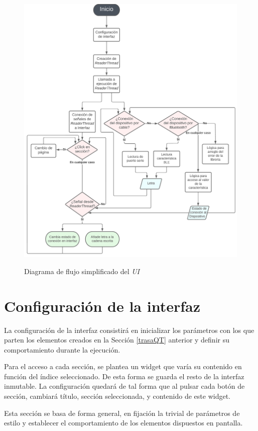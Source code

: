 \begin{figure}[h]
    \centering
    \includegraphics[width=1\textwidth]{capturas/DiagramaFlujoUI.png}\\[-0,20cm]
    \caption{Diagrama de flujo simplificado del \textit{UI}\label{diagFlujoQT}}
\end{figure}

\section{Configuración de la interfaz}
La configuración de la interfaz consistirá en inicializar los parámetros
con los que parten los elementos creados en la Sección \ref{trasaQT} anterior
y definir su comportamiento durante la ejecución.

Para el acceso a cada sección, se plantea un widget que varía su
contenido en función del índice seleccionado.
De esta forma se guarda el resto de la interfaz inmutable.
La configuración quedará de tal forma que al pulsar cada botón de sección,
cambiará título, sección seleccionada, y contenido de este widget.

Esta sección se basa de forma general, en fijación la trivial de parámetros
de estilo y establecer el comportamiento de los elementos dispuestos en pantalla.

